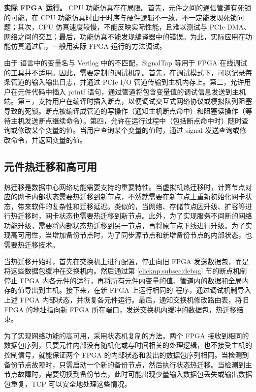 \textbf{实际 FPGA 运行。}
CPU 功能仿真存在局限。首先，元件之间的通信管道有死锁的可能，在 CPU 功能仿真时由于时序与硬件逻辑不一致，不一定能发现死锁问题；其次，CPU 仿真速度较慢，不能反映实际性能，且难以测试与 PCIe DMA、网络之间的交互；最后，功能仿真不能发现编译器中的错误。为此，实际应用在功能仿真通过后，一般用实际 FPGA 运行的方法调试。

由于 \name 语言中的变量名与 Verilog 中的不匹配，SignalTap 等用于 FPGA 在线调试的工具并不适用。因此，\name 需要定制的调试机制。首先，在调试模式下，\name 可以记录每条管道的输入输出日志，并通过 PCIe I/O 管道传输到主机内存上。第二，\name 允许用户在元件代码中插入 printf 语句，通过管道将包含变量值的调试信息发送到主机端。第三，\name 支持用户在编译时插入断点，以便调试交互式网络协议或模拟队列阻塞导致的死锁。断点被编译成管道的写操作（通知主机断点命中）和阻塞读操作（等待主机发送断点继续命令）。第四，\name 允许在运行过程中（包括断点命中时）随时查询或修改某个变量的值。当用户查询某个变量的值时，通过 signal 发送查询或修改命令，并返回变量的值。

\subsection{元件热迁移和高可用}
\label{subsec:clicknp:fault-tolerance}

热迁移是数据中心网络功能需要支持的重要特性。当虚拟机热迁移时，计算节点对应的网卡内部状态需要热迁移到新节点，不然就需要在新节点上重新初始化网卡状态，带来软件的复杂性和迁移延迟。类似的，当网络、存储节点因升级、扩容等进行热迁移时，网卡状态也需要热迁移到新节点。此外，为了实现服务不间断的网络功能升级，需要将内部状态热迁移到另一节点，再将原节点下线进行升级。为了实现高可用性，当增加备份节点时，为了同步源节点和新增备份节点的内部状态，也需要热迁移技术。

当热迁移开始时，首先在交换机上进行配置，停止向旧 FPGA 发送数据包，而是将这些数据包缓冲在交换机内。然后通过第 \ref{clicknp:subsec:debug} 节的断点机制停止 FPGA 内各元件的运行，再将所有元件内变量的值、管道内的数据和全局内存的值导出到主机。接下来，在新 FPGA 上运行相同的 \name 程序，通过调试机制导入上述 FPGA 内部状态，并恢复各元件运行。最后，通知交换机修改路由表，将旧 FPGA 的地址指向新 FPGA 所在端口，发送交换机内缓冲的数据包，热迁移结束。

为了实现网络功能的高可用，\name 采用状态机复制的方法。两个 FPGA 接收到相同的数据包序列，只要元件内部没有随机化或与时间相关的处理逻辑，也不接受主机的控制信号，就能保证两个 FPGA 的内部状态和发出的数据包序列相同。当检测到备份节点故障时，只需启动一个新的备份节点，然后执行状态热迁移。当检测到主节点故障时，需要切换到备份节点，此时可能出现少量输入数据包丢失或输出数据包重复，TCP 可以安全地处理这些情况。

